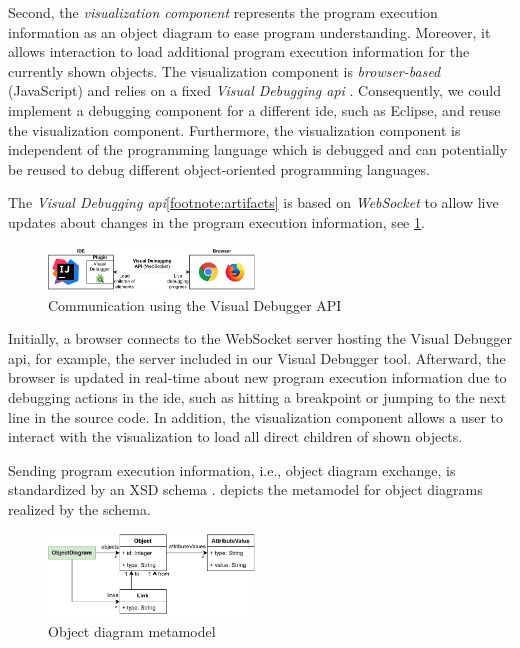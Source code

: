 \documentclass[conference]{IEEEtran}
\begin{document}
Second, the \textit{visualization component} represents the program execution information as an object diagram to ease program understanding.
Moreover, it allows interaction to load additional program execution information for the currently shown objects.
The visualization component is \emph{browser-based} (JavaScript) and relies on a fixed \emph{Visual Debugging \gls*{api}} \cite{ArtifactsICSME2022}.
Consequently, we could implement a debugging component for a different \gls*{ide}, such as Eclipse, and reuse the visualization component.
Furthermore, the visualization component is independent of the programming language which is debugged and can potentially be reused to debug different object-oriented programming languages.

The \textit{Visual Debugging \gls*{api}}\cref{footnote:artifacts} is based on \emph{WebSocket} to allow live updates about changes in the program execution information, see \cref{fig:api}.

\begin{figure}[h]
    \centering
    \includegraphics[width=0.488\textwidth]{images/VD-architecture.pdf}
    \caption{Communication using the Visual Debugger API}
    \label{fig:api}
\end{figure}

Initially, a browser connects to the WebSocket server hosting the Visual Debugger \gls*{api}, for example, the server included in our Visual Debugger tool.
Afterward, the browser is updated in real-time about new program execution information due to debugging actions in the \gls*{ide}, such as hitting a breakpoint or jumping to the next line in the source code.
In addition, the visualization component allows a user to interact with the visualization to load all direct children of shown objects.

Sending program execution information, i.e., object diagram exchange, is standardized by an XSD schema \cite{ArtifactsICSME2022}.
 depicts the metamodel for object diagrams realized by the schema.

\begin{figure}[h]
    \centering
    \includegraphics[width=0.488\textwidth]{images/VD-metamodel.pdf}
    \caption{Object diagram metamodel}
    \label{fig:odMetamodel}
\end{figure}
\end{document}
